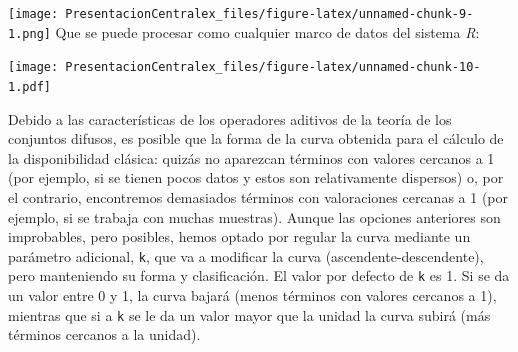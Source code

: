 \documentclass[
]{article}
\newenvironment{Shaded}{\begin{snugshade}}{\end{snugshade}}
\newcommand{\DataTypeTok}[1]{\textcolor[rgb]{0.13,0.29,0.53}{#1}}
\newcommand{\KeywordTok}[1]{\textcolor[rgb]{0.13,0.29,0.53}{\textbf{#1}}}
\newcommand{\NormalTok}[1]{#1}
\newcommand{\OperatorTok}[1]{\textcolor[rgb]{0.81,0.36,0.00}{\textbf{#1}}}
\newcommand{\StringTok}[1]{\textcolor[rgb]{0.31,0.60,0.02}{#1}}
\begin{document}
\texttt{[image: PresentacionCentralex\_files/figure-latex/unnamed-chunk-9-1.png]}
Que se puede procesar como cualquier marco de datos del sistema
\emph{R}:

\begin{Shaded}
\end{Shaded}

\texttt{[image: PresentacionCentralex\_files/figure-latex/unnamed-chunk-10-1.pdf]}

Debido a las características de los operadores aditivos de la teoría de
los conjuntos difusos, es posible que la forma de la curva obtenida para
el cálculo de la disponibilidad clásica: quizás no aparezcan términos
con valores cercanos a 1 (por ejemplo, si se tienen pocos datos y estos
son relativamente dispersos) o, por el contrario, encontremos demasiados
términos con valoraciones cercanas a 1 (por ejemplo, si se trabaja con
muchas muestras). Aunque las opciones anteriores son improbables, pero
posibles, hemos optado por regular la curva mediante un parámetro
adicional, \texttt{k}, que va a modificar la curva
(ascendente-descendente), pero manteniendo su forma y clasificación. El
valor por defecto de \texttt{k} es 1. Si se da un valor entre 0 y 1, la
curva bajará (menos términos con valores cercanos a 1), mientras que si
a \texttt{k} se le da un valor mayor que la unidad la curva subirá (más
términos cercanos a la unidad).
\end{document}
